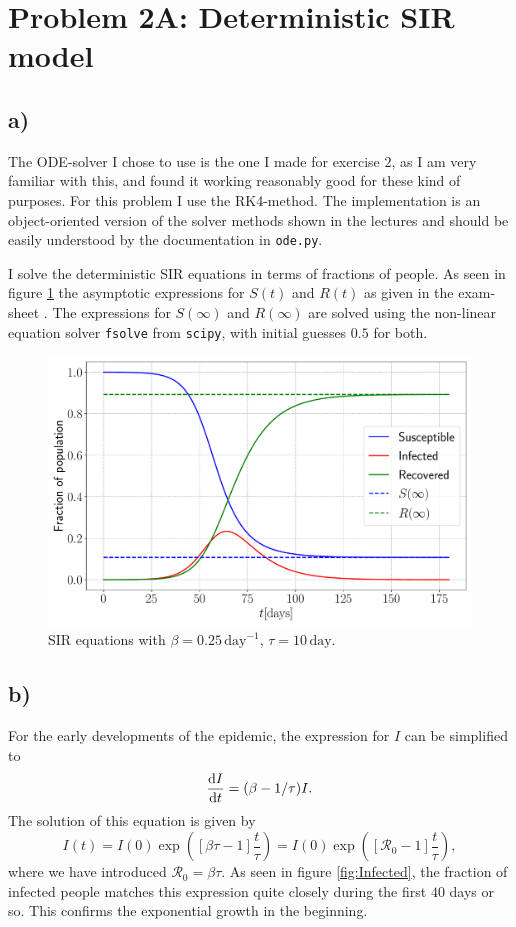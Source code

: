 \section{Problem 2A: Deterministic SIR model}

\subsection{a)}

The ODE-solver I chose to use is the one I made for exercise $2$, as I am very familiar with this, and found it working reasonably good for these kind of purposes. For this problem I use the RK4-method. The implementation is an object-oriented version of the solver methods shown in the lectures and should be easily understood by the documentation in \lstinline|ode.py|.

I solve the deterministic SIR equations in terms of fractions of people. As seen in figure \ref{fig:SIR} the asymptotic expressions for $S(t)$ and $R(t)$ as given in the exam-sheet \cite{sheet}. The expressions for $S(\infty)$ and $R(\infty)$ are solved using the non-linear equation solver \lstinline|fsolve| from \lstinline|scipy|, with initial guesses $0.5$ for both.

\begin{figure}[htb]
	\centering
	\includegraphics[width=0.8\columnwidth]{../fig/2Aa_SIR.pdf}
	\caption{SIR equations with $\beta = 0.25 \, \mathrm{day}^{-1}$, $\tau = 10 \, \mathrm{day}$.}
	\label{fig:SIR}
\end{figure}

\subsection{b)}

For the early developments of the epidemic, the expression for $I$ can be simplified to \cite{sheet}
\begin{equation}\label{eq:I_simp}
	\frac{\text{d} I}{\text{d} t} = (\beta - 1/\tau) I.
\end{equation}
The solution of this equation is given by
$$
	I(t) = I(0) \exp{\left(\left[ \beta \tau - 1 \right] \frac{t}{\tau}\right)} = I(0) \exp{\left(\left[ \mathcal{R}_0 - 1 \right] \frac{t}{\tau} \right)},
$$
where we have introduced $\mathcal{R}_0 = \beta\tau$. As seen in figure \ref{fig:Infected}, the fraction of infected people matches this expression quite closely during the first $40$ days or so. This confirms the exponential growth in the beginning. 


